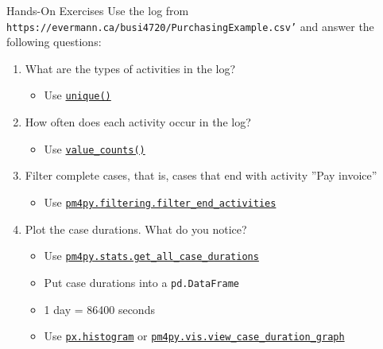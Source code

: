 \documentclass[ignorenonframetext,xcolor=x11names]{beamer}
\begin{document}
\begin{frame}{Hands-On Exercises}
\footnotesize
Use the log from \texttt{https://evermann.ca/busi4720/PurchasingExample.csv'} and answer the following questions:
\begin{enumerate}
    \item What are the types of activities in the log?
    \begin{itemize}
       \item Use \href{https://pandas.pydata.org/docs/reference/api/pandas.unique.html}{\texttt{unique()}}
    \end{itemize}
    \item How often does each activity occur in the log?
    \begin{itemize}
       \item Use \href{https://pandas.pydata.org/pandas-docs/stable/reference/api/pandas.Series.value_counts.html}{\texttt{value\_counts()}}
    \end{itemize}
    \item Filter complete cases, that is, cases that end with activity ''Pay invoice''
    \begin{itemize}
       \item Use \href{https://processintelligence.solutions/static/api/2.7.11/generated/pm4py.filtering.filter_end_activities.html}{\texttt{pm4py.filtering.filter\_end\_activities}}
    \end{itemize}
    \item Plot the case durations. What do you notice?
    \begin{itemize}
       \item Use \href{https://processintelligence.solutions/static/api/2.7.11/generated/pm4py.stats.get_all_case_durations.html}{\texttt{pm4py.stats.get\_all\_case\_durations}}
       \item Put case durations into a \texttt{pd.DataFrame}
       \item 1 day = 86400 seconds
       \item Use \href{https://plotly.com/python/histograms/}{\texttt{px.histogram}} or \href{https://processintelligence.solutions/static/api/2.7.11/generated/pm4py.vis.view_case_duration_graph.html}{\texttt{pm4py.vis.view\_case\_duration\_graph}}
    \end{itemize}
\end{enumerate}
\end{frame}
\end{document}
